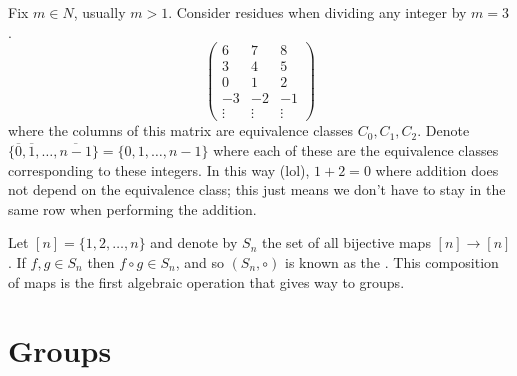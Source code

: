 \documentclass[12pt]{scrartcl}
\begin{document}
\begin{definition}
  Fix $m \in N$, usually $ m > 1$. Consider residues when dividing any integer by $m = 3$. 
  \[\begin{pmatrix}
    6 & 7 & 8\\
    3 & 4 & 5\\
    0 & 1 & 2\\
    -3 & -2 & -1\\
    \vdots & \vdots & \vdots
  \end{pmatrix}\]
  where the columns of this matrix are equivalence classes $C_0, C_1, C_2$. Denote 
  $\{\overline{0}, \overline{1}, \ldots, \overline{n-1}\} = \{0, 1, \ldots, n-1\}$ where each of these are the equivalence classes corresponding to these 
  integers. In this way (lol), $1 + 2 = 0$ where addition does not depend on the equivalence class; this just means we don't have 
  to stay in the same row when performing the addition.
\end{definition}

\begin{note}
  Let $[n] = \{1, 2, \ldots, n\}$ and denote by $S_n$ the set of all bijective maps $[n] \to [n]$. If $f, g \in S_n$
  then $f \circ g \in S_n$, and so $(S_n, \circ)$ is known as the . This composition of maps is the first algebraic operation that gives way to groups.
\end{note}


\section{Groups}
\end{document}
